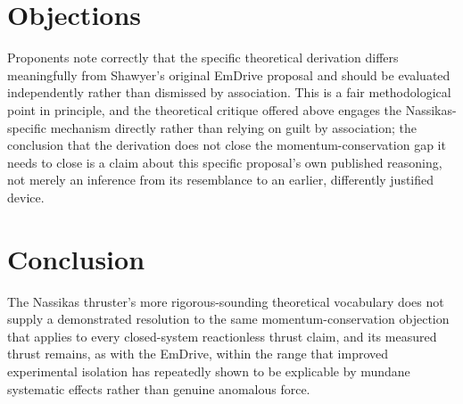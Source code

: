\documentclass[11pt]{article}
\begin{document}
\section{Objections}

Proponents note correctly that the specific theoretical derivation differs meaningfully from Shawyer's original EmDrive proposal and should be evaluated independently rather than dismissed by association. This is a fair methodological point in principle, and the theoretical critique offered above engages the Nassikas-specific mechanism directly rather than relying on guilt by association; the conclusion that the derivation does not close the momentum-conservation gap it needs to close is a claim about this specific proposal's own published reasoning, not merely an inference from its resemblance to an earlier, differently justified device.

\section{Conclusion}

The Nassikas thruster's more rigorous-sounding theoretical vocabulary does not supply a demonstrated resolution to the same momentum-conservation objection that applies to every closed-system reactionless thrust claim, and its measured thrust remains, as with the EmDrive, within the range that improved experimental isolation has repeatedly shown to be explicable by mundane systematic effects rather than genuine anomalous force.
\end{document}
